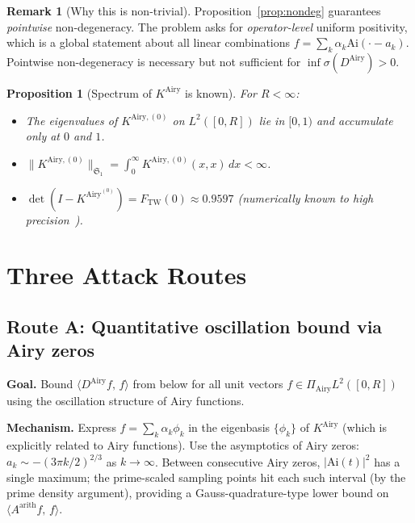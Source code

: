 \documentclass[12pt,a4paper]{amsart}
\newtheorem{proposition}[theorem]{Proposition}
\theoremstyle{definition}
\newtheorem{remark}[theorem]{Remark}
\newcommand{\Ai}{\mathrm{Ai}}
\newcommand{\KAi}{K^{\mathrm{Airy}}}
\newcommand{\DAi}{D^{\mathrm{Airy}}}
\newcommand{\PAi}{\Pi_{\mathrm{Airy}}}
\newcommand{\ip}[2]{\langle #1,\,#2\rangle}
\begin{document}
\begin{remark}[Why this is non-trivial]
Proposition~\ref{prop:nondeg} guarantees \emph{pointwise}
non-degeneracy. The problem asks for \emph{operator-level}
uniform positivity, which is a global statement about
all linear combinations $f = \sum_k \alpha_k \Ai(\cdot - a_k)$.
Pointwise non-degeneracy is necessary but not sufficient
for $\inf\sigma(\DAi) > 0$.
\end{remark}

\begin{proposition}[Spectrum of $\KAi$ is known]%
\label{prop:kairy_spectrum}
For $R < \infty$:
\begin{itemize}
  \item The eigenvalues of $K^{\mathrm{Airy},(0)}$
    on $L^2([0,R])$ lie in $[0,1)$ and accumulate only at $0$ and $1$.
  \item $\|K^{\mathrm{Airy},(0)}\|_{\mathfrak{S}_1}
    = \int_0^{\infty} K^{\mathrm{Airy},(0)}(x,x)\,dx < \infty$.
  \item $\det(I - \KAi^{(0)}) = F_{\mathrm{TW}}(0) \approx 0.9597$
    (numerically known to high precision~\cite{Bornemann2010}).
\end{itemize}
\end{proposition}

\section{Three Attack Routes}
\label{sec:attacks}

\subsection{Route A: Quantitative oscillation bound via Airy zeros}

\textbf{Goal.}
Bound $\ip{\DAi f}{f}$ from below for all unit vectors
$f \in \PAi L^2([0,R])$ using the oscillation structure
of Airy functions.

\textbf{Mechanism.}
Express $f = \sum_k \alpha_k \phi_k$ in the eigenbasis
$\{\phi_k\}$ of $\KAi$ (which is explicitly related
to Airy functions).
Use the asymptotics of Airy zeros:
$a_k \sim -(3\pi k/2)^{2/3}$ as $k \to \infty$.
Between consecutive Airy zeros,
$|\Ai(t)|^2$ has a single maximum;
the prime-scaled sampling points hit each such interval
(by the prime density argument),
providing a Gauss-quadrature-type lower bound on
$\ip{A^{\mathrm{arith}} f}{f}$.
\end{document}
